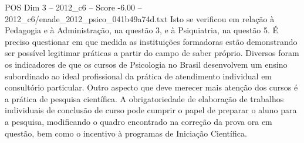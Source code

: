 \begin{textsample}{POS Dim 3 – 2012\_c6 – Score -6.00 – 2012\_c6/enade\_2012\_psico\_041b49a74d.txt}
Isto se verificou em relação à Pedagogia e à Administração, na questão 3, e à Psiquiatria, na questão 5.
É preciso questionar em que medida as instituições formadoras estão demonstrando ser possível legitimar práticas a partir do campo de saber próprio.
Diversos foram os indicadores de que os cursos de Psicologia no Brasil desenvolvem um ensino subordinado ao ideal profissional da prática de atendimento individual em consultório particular.
Outro aspecto que deve merecer mais atenção dos cursos é a prática de pesquisa científica.
A obrigatoriedade de elaboração de trabalhos individuais de conclusão de curso pode cumprir o papel de preparar o aluno para a pesquisa, modificando o quadro encontrado na correção da prova ora em questão, bem como o incentivo à programas de Iniciação Científica.

\end{textsample}
